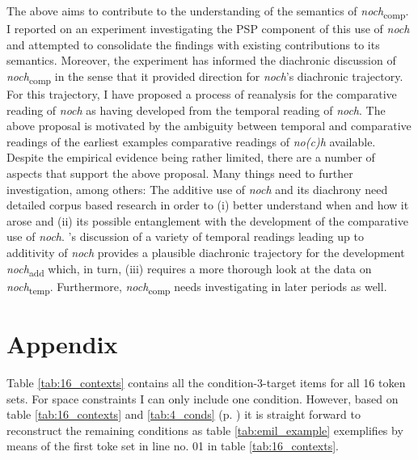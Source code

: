 \documentclass[output=paper,
modfonts
]{langscibook}
\begin{document}
The above aims to contribute to the understanding of the semantics of \textit{noch}\textsubscript{comp}. I reported on an experiment investigating the PSP component of this use of \textit{noch} and attempted to consolidate the findings with existing contributions to its semantics. Moreover, the experiment has informed the diachronic discussion of \textit{noch}\textsubscript{comp} in the sense that it provided direction for \textit{noch}'s diachronic trajectory. For this trajectory, I have proposed a process of reanalysis for the comparative reading of \textit{noch} as having developed from the temporal reading of \textit{noch}. The above proposal is motivated by the ambiguity between temporal and comparative readings of the earliest examples comparative readings of \textit{no(c)h} available. Despite the empirical evidence being rather limited, there are a number of aspects that support the above proposal. Many things need to further investigation, among others: The additive use of \textit{noch} and its diachrony need detailed corpus based research in order to (i) better understand when and how it arose and (ii) its possible entanglement with the development of the comparative use of \textit{noch}. \citeauthor{beck2016a_sub}'s \citeyearpar{beck2016a_sub} discussion of a variety of temporal readings leading up to additivity of \textit{noch} provides a plausible diachronic trajectory for the development \textit{noch}\textsubscript{add} which, in turn, (iii) requires a more thorough look at the data on \textit{noch}\textsubscript{temp}. Furthermore, \textit{noch}\textsubscript{comp} needs investigating in later periods as well.


%
\printbibliography[heading=subbibliography,notkeyword=this]



\section*{Appendix}

\noindent Table \ref{tab:16_contexts} contains all the condition-3-target items for all 16 token sets. For space constraints I can only include one condition. However, based on table \ref{tab:16_contexts} and \ref{tab:4_conds} (p. \pageref{tab:4_conds}) it is straight forward to reconstruct the remaining conditions as table \ref{tab:emil_example} exemplifies by means of the first toke set in line no. 01 in table \ref{tab:16_contexts}.
\end{document}
